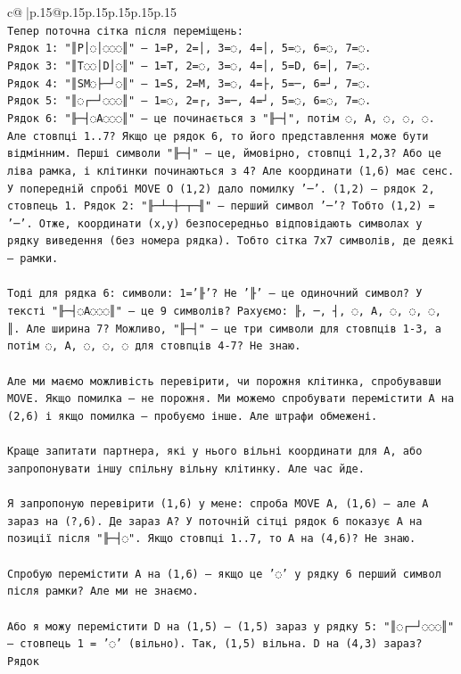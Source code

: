 \documentclass{article}
\begin{document}
{\begin{supertabular}{c@{$\;$}|p{.15\linewidth}@{}p{.15\linewidth}p{.15\linewidth}p{.15\linewidth}p{.15\linewidth}p{.15\linewidth}}
{{{\\ 
\texttt{Тепер поточна сітка після переміщень:} \\
\texttt{Рядок 1: "║P│◌│◌◌◌║" — 1=P, 2=│, 3=◌, 4=│, 5=◌, 6=◌, 7=◌.} \\
\texttt{Рядок 3: "║T◌◌│D│◌║" — 1=T, 2=◌, 3=◌, 4=│, 5=D, 6=│, 7=◌.} \\
\texttt{Рядок 4: "║SM◌├─┘◌║" — 1=S, 2=M, 3=◌, 4=├, 5=─, 6=┘, 7=◌.} \\
\texttt{Рядок 5: "║◌┌─┘◌◌◌║" — 1=◌, 2=┌, 3=─, 4=┘, 5=◌, 6=◌, 7=◌.} \\
\texttt{Рядок 6: "╟─┤◌A◌◌◌║" — це починається з "╟─┤", потім ◌, A, ◌, ◌, ◌. Але стовпці 1..7? Якщо це рядок 6, то його представлення може бути відмінним. Перші символи "╟─┤" — це, ймовірно, стовпці 1,2,3? Або це ліва рамка, і клітинки починаються з 4? Але координати (1,6) має сенс. У попередній спробі MOVE O (1,2) дало помилку '─'. (1,2) — рядок 2, стовпець 1. Рядок 2: "╟─┴─┼─┬─╢" — перший символ '─'? Тобто (1,2) = '─'. Отже, координати (x,y) безпосередньо відповідають символах у рядку виведення (без номера рядка). Тобто сітка 7x7 символів, де деякі — рамки.} \\
\\ 
\texttt{Тоді для рядка 6: символи: 1='╟'? Не '╟' — це одиночний символ? У тексті "╟─┤◌A◌◌◌║" — це 9 символів? Рахуємо: ╟, ─, ┤, ◌, A, ◌, ◌, ◌, ║. Але ширина 7? Можливо, "╟─┤" — це три символи для стовпців 1{-}3, а потім ◌, A, ◌, ◌, ◌ для стовпців 4{-}7? Не знаю.} \\
\\ 
\texttt{Але ми маємо можливість перевірити, чи порожня клітинка, спробувавши MOVE. Якщо помилка — не порожня. Ми можемо спробувати перемістити A на (2,6) і якщо помилка — пробуємо інше. Але штрафи обмежені.} \\
\\ 
\texttt{Краще запитати партнера, які у нього вільні координати для A, або запропонувати іншу спільну вільну клітинку. Але час йде.} \\
\\ 
\texttt{Я запропоную перевірити (1,6) у мене: спроба MOVE A, (1,6) — але A зараз на (?,6). Де зараз A? У поточній сітці рядок 6 показує A на позиції після "╟─┤◌". Якщо стовпці 1..7, то A на (4,6)? Не знаю.} \\
\\ 
\texttt{Спробую перемістити A на (1,6) — якщо це '◌' у рядку 6 перший символ після рамки? Але ми не знаємо.} \\
\\ 
\texttt{Або я можу перемістити D на (1,5) — (1,5) зараз у рядку 5: "║◌┌─┘◌◌◌║" — стовпець 1 = '◌' (вільно). Так, (1,5) вільна. D на (4,3) зараз? Рядок} \\
            }
        }
    }
     \\ \\


\end{supertabular}}
\end{document}
